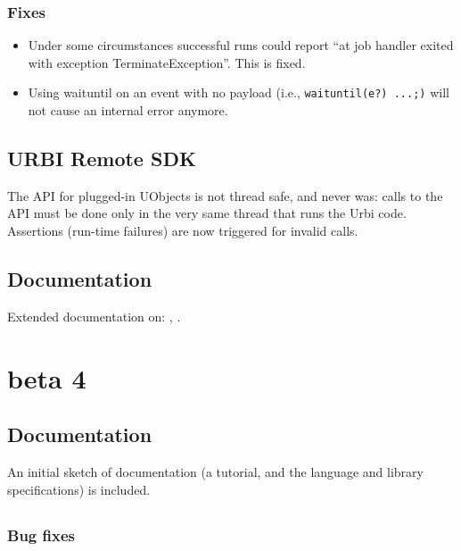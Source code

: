 \subsubsection{Fixes}
\begin{itemize}
\item Under some circumstances successful runs could report ``at job
  handler exited with exception TerminateException''.  This is fixed.

\item Using waituntil on an event with no payload (i.e.,
  \lstinline|waituntil(e?) ...;)| will not cause an internal error
  anymore.
\end{itemize}

\subsection{URBI Remote SDK}

The API for plugged-in UObjects is not thread safe, and never was:
calls to the API must be done only in the very same thread that runs
the Urbi code.  Assertions (run-time failures) are now triggered for
invalid calls.

\subsection{Documentation}

Extended documentation on: , .


\section{ beta 4}

\subsection{Documentation}

An initial sketch of documentation (a tutorial, and the language and
library specifications) is included.

\subsection{\us}
\subsubsection{Bug fixes}

